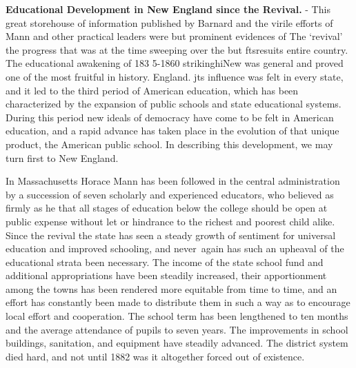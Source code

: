 \documentclass[]{book}
\begin{document}
\textbf{Educational Development in New England since the Revival.} - This great storehouse of information published by Barnard and the virile efforts of Mann and other practical leaders were but prominent evidences of The `revival' the progress that was at the time sweeping over the but ftsresuits entire country. The educational awakening of 183 5-1860 strikinghiNew was general and proved one of the most fruitful in history. England. jts influence was felt in every state, and it led to the third period of American education, which has been characterized by the expansion of public schools and state educational systems. During this period new ideals of democracy have come to be felt in American education, and a rapid advance has taken place in the evolution of that unique product, the American public school. In describing this development, we may turn first to New England.

In Massachusetts Horace Mann has been followed in the central administration by a succession of seven scholarly and experienced educators, who believed as firmly as he that all stages of education below the college should be open at public expense without let or hindrance to the richest and poorest child alike. Since the revival the state has seen a steady growth of sentiment for universal education and improved schooling, and never~again has such an upheaval of the educational strata been necessary. The income of the state school fund and additional appropriations have been steadily increased, their apportionment among the towns has been rendered more equitable from time to time, and an effort has constantly been made to distribute them in such a way as to encourage local effort and cooperation. The school term has been lengthened to ten months and the average attendance of pupils to seven years. The improvements in school buildings, sanitation, and equipment have steadily advanced. The district system died hard, and not until 1882 was it altogether forced out of existence.
\end{document}

